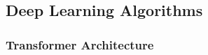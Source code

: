 \subsection{Deep Learning Algorithms}

\subsubsection*{Transformer Architecture}






\begin{comment}
    \begin{definition}[Directly-Follows Graph]
    
\end{definition}

\begin{definition}[Finally-Follows Graph]
    
\end{definition}

\begin{definition}[Non-local dependency]
    
\end{definition}

\begin{definition}[Mining Non-local dependencies]
    
\end{definition}

\end{comment}



\begin{comment}
    Limitations of translucent logs: Cannot solve the problem of non-local dependencies, as there are non-free-choice nets that are not lucent. However: Translucent event logs function as a safeguard to differentiate non-local dependencies from the local dependencies in a potentially incomplete event log.
\end{comment}
